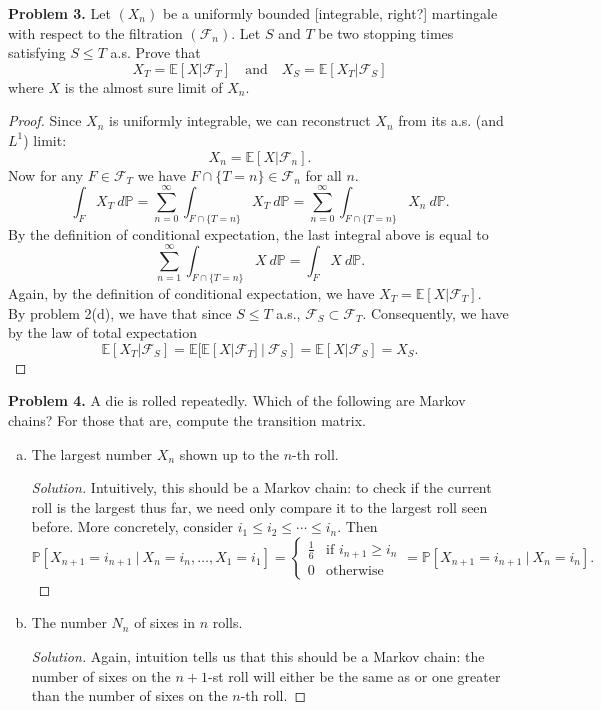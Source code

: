 \documentclass[11pt,letterpaper]{report}
\newcommand{\mcal}[1]{\mathcal{#1}}
\newcommand{\E}{\mathbb{E}}
\newcommand{\Prob}{\mathbb{P}}
\newenvironment{solution}
{\begin{proof}[Solution]}
{\end{proof}}
\begin{document}
\noindent\textbf{Problem 3. }
Let $(X_n)$ be a uniformly bounded [integrable, right?] martingale with respect to the filtration $(\mcal{F}_n)$. Let $S$ and $T$ be two stopping times satisfying $S\leq T$ a.s. Prove that
\[
X_T = \E[X|\mcal{F}_T]\quad\text{and}\quad X_S = \E[X_T|\mcal{F}_S]
\]
where $X$ is the almost sure limit of $X_n$.
\begin{proof}
	Since $X_n$ is uniformly integrable, we can reconstruct $X_n$ from its a.s. (and $L^1$) limit:
	\[
	X_n = \E[X|\mcal{F}_n].
	\]
	Now for any $F\in \mcal{F}_T$ we have $F\cap \{T=n\} \in \mcal{F}_n$ for all $n$.
	\[
	\int_FX_T\ d\Prob = \sum_{n=0}^\infty\int_{F\cap \{T=n\}}X_T\ d\Prob = \sum_{n=0}^\infty \int_{F\cap \{T = n\}}X_n\ d\Prob.
	\]
	By the definition of conditional expectation, the last integral above is equal to
	\[
	\sum_{n=1}^\infty\int_{F\cap \{T = n\}}X\ d\Prob = \int_FX\ d\Prob.
	\]
	Again, by the definition of conditional expectation, we have $X_T = \E[X|\mcal{F}_T]$.\\

	\noindent By problem 2(d), we have that since $S\leq T$ a.s., $\mcal{F}_S\subset \mcal{F}_T$. Consequently, we have by the law of total expectation
	\[
	\E[X_T|\mcal{F}_S] = \E[\E[X|\mcal{F}_T]\ |\ \mcal{F}_S] = \E[X|\mcal{F}_S] = X_S.
	\]
\end{proof}

\noindent\textbf{Problem 4. }
A die is rolled repeatedly. Which of the following are Markov chains? For those that are, compute the transition matrix.
\begin{enumerate}[(a)]
	\item The largest number $X_n$ shown up to the $n$-th roll.
	\begin{solution}
		Intuitively, this should be a Markov chain: to check if the current roll is the largest thus far, we need only compare it to the largest roll seen before. More concretely, consider $i_1\leq i_2 \leq \cdots \leq i_n$. Then
		\[
		\Prob[X_{n+1} = i_{n+1}\ |\ X_n = i_n, \ldots, X_1 = i_1] = \begin{cases}
			\frac{1}{6}&\text{if }i_{n+1}\geq i_n\\
			0&\text{otherwise}
		\end{cases} = \Prob[X_{n+1} = i_{n+1}\ |\ X_n = i_n].
		\]
	\end{solution}

	\item The number $N_n$ of sixes in $n$ rolls.
	\begin{solution}
		Again, intuition tells us that this should be a Markov chain: the number of sixes on the $n+1$-st roll will either be the same as or one greater than the number of sixes on the $n$-th roll. 
	\end{solution}
\end{enumerate}
\end{document}
